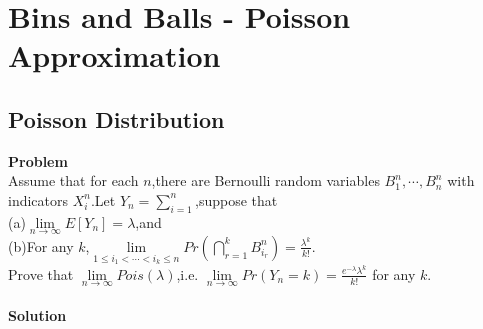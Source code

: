 \chapter{Bins and Balls - Poisson Approximation}
	
	\section{Poisson Distribution}
	\textbf{Problem}\\
	Assume that for each $n$,there are Bernoulli random variables $B^n_1,\cdots,B^n_n$ with indicators $X^n_i$.Let $Y_n=\sum_{i=1}^{n}$,suppose that\\
	(a)$\lim\limits_{n \rightarrow \infty}E[Y_n]=\lambda$,and\\
	(b)For any $k$,$\lim\limits_{1 \leq i_1 < \cdots < i_k \leq n}Pr(\bigcap_{r=1}^{k}B^n_{i_r})=\frac{\lambda^k}{k!}$.\\
	Prove that $\lim\limits_{n \rightarrow \infty}Pois(\lambda)$,i.e. $\lim\limits_{n \rightarrow \infty}Pr(Y_n=k)=\frac{e^{-\lambda}\lambda^k}{k!}$ for any $k$.\\\\
	\textbf{Solution}\\
